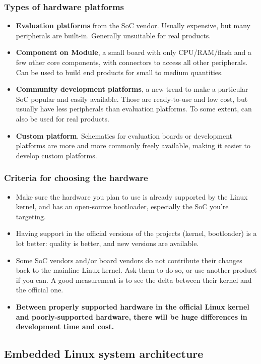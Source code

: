 \begin{frame}
  \frametitle{Types of hardware platforms}
  \begin{itemize}
  \item {\bf Evaluation platforms} from the SoC vendor. Usually
    expensive, but many peripherals are built-in. Generally unsuitable
    for real products.
  \item {\bf Component on Module}, a small board with only
    CPU/RAM/flash and a few other core components, with connectors to
    access all other peripherals. Can be used to build end products
    for small to medium quantities.
  \item {\bf Community development platforms}, a new trend to make a
    particular SoC popular and easily available. Those are
    ready-to-use and low cost, but usually have less peripherals than
    evaluation platforms. To some extent, can also be used for real
    products.
  \item {\bf Custom platform}. Schematics for evaluation boards or
    development platforms are more and more commonly freely available,
    making it easier to develop custom platforms.
\end{itemize}
\end{frame}

\begin{frame}
  \frametitle{Criteria for choosing the hardware}
  \begin{itemize}
  \item Make sure the hardware you plan to use is already supported by
    the Linux kernel, and has an open-source bootloader, especially
    the SoC you’re targeting.
  \item Having support in the official versions of the projects
    (kernel, bootloader) is a lot better: quality is better, and new
    versions are available.
  \item Some SoC vendors and/or board vendors do not contribute their
    changes back to the mainline Linux kernel. Ask them to do so, or
    use another product if you can. A good measurement is to see the
    delta between their kernel and the official one.
  \item {\bf Between properly supported hardware in the official Linux
      kernel and poorly-supported hardware, there will be huge
      differences in development time and cost.}
  \end{itemize}
\end{frame}

\subsection{Embedded Linux system architecture}

